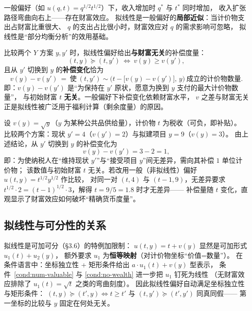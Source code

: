 \begin{remark}[对照：正常品的收入扩张路径]
一般偏好（如 $u(q,t)=q^{1/2}t^{1/2}$）下，收入增加时 $q^*$ 与 $t^*$ 同时增加，
收入扩张路径弯曲向右上——存在财富效应。
拟线性是一般偏好的\textbf{局部近似}：当计价物支出占财富比重很大、
$q$ 的支出占比很小时，财富效应对 $q$ 的需求影响可忽略，
拟线性是“部分均衡分析”的效用基础。
\end{remark}


比较两个 $Y$ 方案 $y,y'$ 时，拟线性偏好给出\textbf{与财富无关}的补偿度量：
\[
(t,y)\succeq(t,y')\ \Longleftrightarrow\ v(y)\ge v(y'),
\]
且从 $y'$ 切换到 $y$ 的\textbf{补偿变化}恰为
\[
v(y)-v(y')\ =\ \text{使}\ (t,y')\sim\bigl(t-\bigl[v(y)-v(y')\bigr],\,y\bigr)\ \text{成立的计价物数量}.
\]
即：$v(y)-v(y')$ 是“为保持在 $y'$ 原状，愿意为换到 $y$ 支付的最大计价物数量”，
与初始财富 $t$ \textbf{无关}。一般偏好下补偿变化依赖财富水平，
$v$ 之差与财富无关正是拟线性被广泛用于福利计算（剩余度量）的原因。

\begin{example}[补偿变化的数值计算]\label{ex:ql-welfare}
设 $v(y)=\sqrt{y}$（$y$ 为某种公共品供给量），计价物 $t$ 为税收（可负，即补贴）。
比较两个方案：现状 $y'=4$（$v(y')=2$）与拟建项目 $y=9$（$v(y)=3$）。
由上述结论，从 $y'$ 切换到 $y$ 的补偿变化为
\[
v(y)-v(y')=3-2=1,
\]
即：为使纳税人在“维持现状 $y'$”与“接受项目 $y$”间无差异，需向其补偿 $1$ 单位计价物；
该数值与初始财富 $t$ 无关。若改用一般（非拟线性）偏好 $u(t,y)=t^{1/2}y^{1/2}$ 作比较，
对同一对 $(t,4)$ 与 $(t-1,9)$，无差异要求
$t^{1/2}\cdot2=(t-1)^{1/2}\cdot3$，解得 $t=9/5=1.8$ 时才无差异——
补偿量随 $t$ 变化，直观显示了财富效应如何破坏“精确货币度量”。
\end{example}

\subsection{拟线性与可分性的关系}

拟线性是可加可分（§3.6）的特例加限制：
$u(t,y)=t+v(y)$ 显然是可加形式 $u_1(t)+u_2(y)$，
额外要求 $u_1$ 为\textbf{恒等映射}（对计价物坐标“价值=数量”）。
在条件语言中：坐标独立性 + 矩形条件给出 $a\cdot u_1(t)+v(y)$ 型表示，
条件~\ref{cond:num-valuable} 与 \ref{cond:no-wealth} 进一步把 $u_1$ 钉死为线性
（无财富效应排除了 $u_1(t)=\sqrt{t}$ 之类的弯曲刻度）。
因此拟线性偏好自动满足坐标独立性与矩形条件：
$(t,y)\succeq(t',y)\iff t\ge t'$ 与 $(t,y')\succeq(t',y')$ 同真同假——
第一坐标的比较与 $y$ 固定在何处无关。

